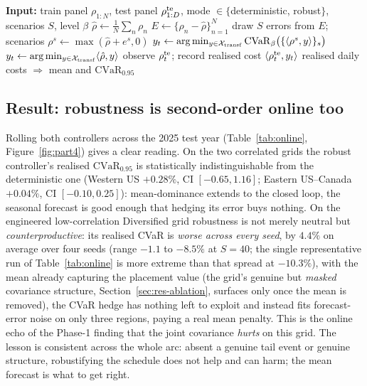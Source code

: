 \documentclass[12pt]{article}
\newcommand{\CVaR}{\mathrm{CVaR}}
\begin{document}
\begin{algorithm}[t]
\caption{Rolling-horizon transfer control (one controller, one year)}
\label{alg:online}
\begin{algorithmic}[1]
\State \textbf{Input:} train panel $\rho_{1:N}$, test panel $\rho^{\rm te}_{1:D}$,
mode $\in\{$deterministic, robust$\}$, scenarios $S$, level $\beta$
\State $\hat\rho \gets \tfrac1N\sum_n \rho_n$ 
\State $E \gets \{\rho_n-\hat\rho\}_{n=1}^N$ 
     \State draw $S$ errors from $E$; scenarios $\rho^s \gets \max(\hat\rho+e^s,0)$
     \State $y_t \gets \arg\min_{y\in\mathcal X_{\rm transf}} \CVaR_\beta\big(\{\langle\rho^s,y\rangle\}_s\big)$
  \Else
     \State $y_t \gets \arg\min_{y\in\mathcal X_{\rm transf}} \langle\hat\rho,y\rangle$
  \EndIf
  \State observe $\rho^{\rm te}_t$; record realised cost $\langle\rho^{\rm te}_t, y_t\rangle$
\EndFor
\State \Return realised daily costs $\Rightarrow$ mean and $\CVaR_{0.95}$
\end{algorithmic}
\end{algorithm}

\subsection{Result: robustness is second-order online too}
Rolling both controllers across the 2025 test year (Table~\ref{tab:online},
Figure~\ref{fig:part4}) gives a clear reading. On the two correlated grids the robust
controller's realised $\CVaR_{0.95}$ is statistically indistinguishable from the
deterministic one (Western US $+0.28\%$, CI $[-0.65,1.16]$; Eastern US--Canada
$+0.04\%$, CI $[-0.10,0.25]$): mean-dominance extends to the closed loop, the seasonal
forecast is good enough that hedging its error buys nothing. On the engineered
low-correlation Diversified grid robustness is not merely neutral but
\emph{counterproductive}: its realised CVaR is \emph{worse across every seed}, by
$4.4\%$ on average over four seeds (range $-1.1$ to $-8.5\%$ at $S{=}40$; the single
representative run of Table~\ref{tab:online} is more extreme than that spread at
$-10.3\%$), with
the mean already capturing the placement value (the grid's
genuine but \emph{masked} covariance structure, Section~\ref{sec:res-ablation},
surfaces only once the mean is removed), the CVaR hedge has nothing left to exploit
and instead fits forecast-error noise on only three regions, paying a real mean
penalty. This is the online echo of the Phase-1 finding that the joint covariance
\emph{hurts} on this grid. The lesson is consistent
across the whole arc: absent a genuine tail event or genuine structure, robustifying
the schedule does not help and can harm; the mean forecast is what to get right.
\end{document}
